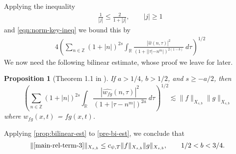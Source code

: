 \documentclass[12pt,reqno]{amsart}
\numberwithin{equation}{section}  %
\numberwithin{figure}{section}
\newcommand{\rr}{\mathbb{R}}
\newcommand{\zz}{\mathbb{Z}}
\newcommand{\wh}{\widehat}
\theoremstyle{plain}
\newtheorem{proposition}{Proposition}
\theoremstyle{definition}
\theoremstyle{remark}
\begin{document}
Applying the inequality
\begin{equation}
	\label{one-plus-ineq}
	\begin{split}
		& \frac{1}{|j|} \le \frac{2}{1 + |j| } , 
		\qquad |j| \ge 1
   	\end{split}
\end{equation}
and \eqref{eqn:norm-key-ineq} we bound this by
\begin{equation}
  \label{pre-bi-est}
  \begin{split}
		& 4 \left( \sum_{n \in 
		\zz} \left (1 + |n| \right )^{2s} \int_\rr
		\frac{|\wh{w}(n, \tau) |^2}{(1+ |  |\tau| - 
    n^{m}|)^{2(1-b)}} 
		 \ d \tau 
		\right)^{1/2}
\end{split}
\end{equation}
%
%
%
%
%
%
We now need the following bilinear estimate, whose proof we leave for later.
%
%
%
%
%
%
%
%
\begin{proposition}[Theorem 1.1 in \cite{Farah:2009uq}]
\label{prop:bilinear-est}
	If $a > 1/4$, $b > 1/2$, and $s \ge -a/2$, 
  then 
	\begin{equation}
		\left( \sum_{n \in \zz} \left (1 + |n| \right )^{2s} \int_\rr
		\frac{|\wh{w_{fg}}(n, \tau) |^2}{\left (1+ |\tau - 
    n^{m}| \right )^{2a}} 
		 \ d \tau 
		\right)^{1/2}
		\lesssim \|f\|_{X_{s,b}} \|g\|_{X_{s,b}}
	\end{equation}
	where $w_{fg}(x,t)$ = $fg (x,t)$.
%
%
%
%
\end{proposition}
%
Applying \autoref{prop:bilinear-est} to \eqref{pre-bi-est}, we conclude that
%
%
%
%
\begin{equation}
	\label{main-int2-est}
	\begin{split}
		\|\eqref{main-rel-term-3}\|_{X_{s,b}} \le c_{\psi, T}\|f\|_{X_{s,b}}
    \|g\|_{X_{s,b}}, \qquad 1/2 < b < 3/4.
	\end{split}
\end{equation}
%
%
%
%
%
%
%
%
%
%
%
\end{document}
